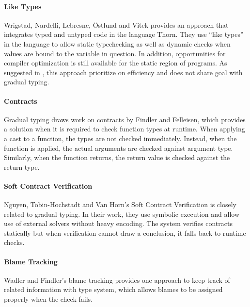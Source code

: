 \paragraph{Like Types}

Wrigstad, Nardelli, Lebresne, {\"O}stlund and Vitek\cite{wrigstad2010integrating}
provides an approach that integrates typed and untyped code
in the language Thorn. They use ``like types'' in the language
to allow static typechecking as well as dynamic checks when
values are bound to the variable in question.
In addition, opportunities for compiler optimization
is still available for the static region of programs.
As suggested in \cite{siek2015refined}, this approach
prioritize on efficiency and does not share goal with gradual typing.

\paragraph{Contracts}

Gradual typing draws work on contracts
by Findler and Felleisen\cite{findler2002contracts,gray2005fine},
which provides a solution when it is required to check function types at runtime.
When applying a cast to a function, the types are not checked immediately.
Instead, when the function is applied, the actual arguments are checked
against argument type. Similarly, when the function returns,
the return value is checked against the return type.

\paragraph{Soft Contract Verification}

Nguyen, Tobin-Hochstadt and Van Horn's Soft Contract Verification\cite{nguyen2014soft} is closely related to gradual typing. In their work, they use symbolic execution
and allow use of external solvers without heavy encoding.
The system verifies contracts statically but
when verification cannot draw a conclusion, it falls back to
runtime checks.

\paragraph{Blame Tracking}

Wadler and Findler's blame tracking\cite{wadler2009well}
provides one approach to keep track of related information with type system,
which allows blames to be assigned properly when the check fails.

